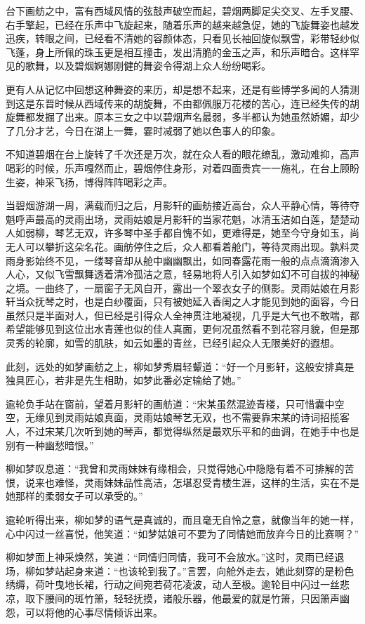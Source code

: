 台下画舫之中，富有西域风情的弦鼓声破空而起，碧烟两脚足尖交叉、左手叉腰、右手擎起，已经在乐声中飞旋起来，随着乐声的越来越急促，她的飞旋舞姿也越发迅疾，转眼之间，已经看不清她的容颜体态，只看见长袖回旋似飘雪，彩带轻纱似飞蓬，身上所佩的珠玉更是相互撞击，发出清脆的金玉之声，和乐声暗合。这样罕见的歌舞，以及碧烟婀娜刚健的舞姿令得湖上众人纷纷喝彩。

更有人从记忆中回想这种舞姿的来历，却是想不起来，还是有些博学多闻的人猜测到这是东晋时候从西域传来的胡旋舞，不由都佩服万花楼的苦心，连已经失传的胡旋舞都发掘了出来。原本三女之中以碧烟声名最弱，多半都认为她虽然娇媚，却少了几分才艺，今日在湖上一舞，霎时减弱了她以色事人的印象。

不知道碧烟在台上旋转了千次还是万次，就在众人看的眼花缭乱，激动难抑，高声喝彩的时候，乐声嘎然而止，碧烟停住身形，对着四面贵宾一一施礼，在台上顾盼生姿，神采飞扬，博得阵阵喝彩之声。

当碧烟游湖一周，满载而归之后，月影轩的画舫接近高台，众人平静心情，等待夺魁呼声最高的灵雨出场，灵雨姑娘是月影轩的当家花魁，冰清玉洁如白莲，楚楚动人如弱柳，琴艺无双，许多琴中圣手都自愧不如，更难得是，她至今守身如玉，尚无人可以攀折这朵名花。画舫停住之后，众人都看着舱门，等待灵雨出现。孰料灵雨身影始终不见，一缕琴音却从舱中幽幽飘出，如同春露花雨一般的点点滴滴渗入人心，又似飞雪飘舞透着清冷孤洁之意，轻易地将人引入如梦如幻不可自拔的神秘之境。一曲终了，一扇窗子无风自开，露出一个翠衣女子的侧影。灵雨姑娘在月影轩当众抚琴之时，也是白纱覆面，只有被她延入香闺之人才能见到她的面容，今日虽然只是半面对人，但已经是引得众人全神贯注地凝视，几乎是大气也不敢喘，都希望能够见到这位出水青莲也似的佳人真面，更何况虽然看不到花容月貌，但是那灵秀的轮廓，如雪的肌肤，如云如墨的青丝，已经引起众人无限美好的遐想。

此刻，远处的如梦画舫之上，柳如梦秀眉轻颦道：“好一个月影轩，这般安排真是独具匠心，若非是先生相助，如梦此番必定输给了她。”

逾轮负手站在窗前，望着月影轩的画舫道：“宋某虽然混迹青楼，只可惜囊中空空，无缘见到灵雨姑娘真面，灵雨姑娘琴艺无双，也不需要靠宋某的诗词招揽客人，不过宋某几次听到她的琴声，都觉得纵然是最欢乐平和的曲调，在她手中也是别有一种幽愁暗恨。”

柳如梦叹息道：“我曾和灵雨妹妹有缘相会，只觉得她心中隐隐有着不可排解的苦恨，说来也难怪，灵雨妹妹品性高洁，怎堪忍受青楼生涯，这样的生活，实在不是她那样的柔弱女子可以承受的。”

逾轮听得出来，柳如梦的语气是真诚的，而且毫无自怜之意，就像当年的她一样，心中闪过一丝喜悦，他笑道：“如梦姑娘可不要为了同情她而放弃今日的比赛啊？”

柳如梦面上神采焕然，笑道：“同情归同情，我可不会放水。”这时，灵雨已经退场，柳如梦站起身来道：“也该轮到我了。”言罢，向舱外走去，她此刻穿的是粉色绣缛，荷叶曳地长裙，行动之间宛若荷花凌波，动人至极。逾轮目中闪过一丝悲凉，取下腰间的斑竹箫，轻轻抚摸，诸般乐器，他最爱的就是竹箫，只因箫声幽怨，可以将他的心事尽情倾诉出来。

